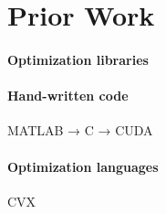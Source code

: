 \section{Prior Work}
\label{sec:prior}

\paragraph{Optimization libraries}

\paragraph{Hand-written code}
MATLAB → C → CUDA

\paragraph{Optimization languages}
CVX
